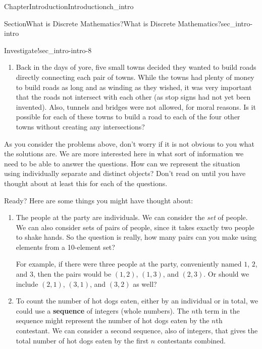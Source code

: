 \documentclass[twoside,11pt,]{book}
\newcommand{\terminology}[1]{\textbf{#1}}
\numberwithin{equation}{chapter}
\begin{document}
\begin{chapterptx}{Chapter}{Introduction}{}{Introduction}{}{}{ch_intro}
\begin{sectionptx}{Section}{What is Discrete Mathematics?}{}{What is Discrete Mathematics?}{}{}{sec_intro-intro}
\begin{investigation}{Investigate!}{}{sec_intro-intro-8}
\begin{enumerate}
\begin{sidebyside}{2}{0.05}{0.05}{0.1}
\begin{sbspanel}{0.4}
For either chest, if the chest's message is true, then the chest contains treasure.%
\end{sbspanel}%
\end{sidebyside}%
\par
The problem is, you don't know whether the messages are true or false.  What do you do?%
\item{}Back in the days of yore, five small towns decided they wanted to build roads directly connecting each pair of towns. While the towns had plenty of money to build roads as long and as winding as they wished, it was very important that the roads not intersect with each other (as stop signs had not yet been invented). Also, tunnels and bridges were not allowed, for moral reasons. Is it possible for each of these towns to build a road to each of the four other towns without creating any intersections?%
\end{enumerate}
%
\end{investigation}%
As you consider the problems above, don't worry if it is not obvious to you what the solutions are. We are more interested here in what sort of information we need to be able to answer the questions. How can we represent the situation using individually separate and distinct objects?  Don't read on until you have thought about at least this for each of the questions.%
\par
Ready?  Here are some things you might have thought about:%
\begin{enumerate}
\item{}The people at the party are individuals. We can consider the \emph{set} of people. We can also consider sets of pairs of people, since it takes exactly two people to shake hands. So the question is really, how many pairs can you make using elements from a 10-element set?%
\par
For example, if there were three people at the party, conveniently named \(1\), \(2\), and \(3\), then the pairs would be \((1,2)\), \((1,3)\), and \((2,3)\).  Or should we include \((2,1)\), \((3,1)\), and \((3,2)\) as well?%
\item{}To count the number of hot dogs eaten, either by an individual or in total, we could use a \terminology{sequence} of integers (whole numbers).  The \(n\)th term in the sequence might represent the number of hot dogs eaten by the \(n\)th contestant.  We can consider a second sequence, also of integers, that gives the total number of hot dogs eaten by the first \(n\) contestants combined.%
\par

\end{enumerate}
\end{sectionptx}
\end{chapterptx}
\end{document}
